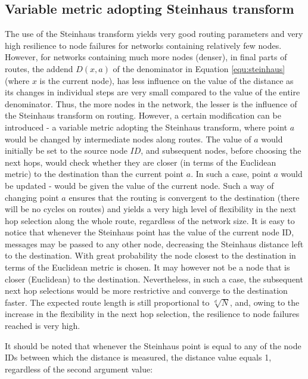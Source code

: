 \subsection{Variable metric adopting Steinhaus transform}
\label{sec:varSteinhaus}

The use of the Steinhaus transform yields very good routing parameters and very high resilience to node failures for networks containing relatively few nodes. However, for networks containing much more nodes (denser), in final parts of routes, the addend $D(x,a)$ of the denominator in Equation \ref{equ:steinhaus} (where $x$ is the current node), has less influence on the value of the distance as its changes in individual steps are very small compared to the value of the entire denominator. Thus, the more nodes in the network, the lesser is the influence of the Steinhaus transform on routing. However, a certain modification can be introduced - a variable metric adopting the Steinhaus transform, where point $a$ would be changed by intermediate nodes along routes. The value of $a$ would initially be set to the source node $ID$, and subsequent nodes, before choosing the next hops, would check whether they are closer (in terms of the Euclidean metric) to the destination than the current point $a$. In such a case, point $a$ would be updated - would be given the value of the current node. Such a way of changing point $a$ ensures that the routing is convergent to the destination (there will be no cycles on routes) and yields a very high level of flexibility in the next hop selection along the whole route, regardless of the network size. It is easy to notice that whenever the Steinhaus point has the value of the current node ID, messages may be passed to any other node, decreasing the Steinhaus distance left to the destination. With great probability the node closest to the destination in terms of the Euclidean metric is chosen. It may however not be a node that is closer (Euclidean) to the destination. Nevertheless, in such a case, the subsequent next hop selections would be more restrictive and converge to the destination faster. The expected route length is still proportional to $\sqrt[d]{N}$, and, owing to the increase in the flexibility in the next hop selection, the resilience to node failures reached is very high.

It should be noted that whenever the Steinhaus point is equal to any of the node IDs between which the distance is measured, the distance value equals 1, regardless of the second argument value:

